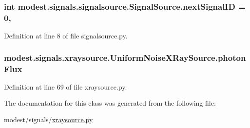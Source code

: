 \subsubsection[{\texorpdfstring{next\+Signal\+ID}{nextSignalID}}]{\setlength{\rightskip}{0pt plus 5cm}int modest.\+signals.\+signalsource.\+Signal\+Source.\+next\+Signal\+ID = 0\hspace{0.3cm}{\ttfamily [static]}, {\ttfamily [inherited]}}\hypertarget{classmodest_1_1signals_1_1signalsource_1_1SignalSource_a453eafb550b551adbec0903deb63dfce}{}\label{classmodest_1_1signals_1_1signalsource_1_1SignalSource_a453eafb550b551adbec0903deb63dfce}


Definition at line 8 of file signalsource.\+py.

\subsubsection[{\texorpdfstring{photon\+Flux}{photonFlux}}]{\setlength{\rightskip}{0pt plus 5cm}modest.\+signals.\+xraysource.\+Uniform\+Noise\+X\+Ray\+Source.\+photon\+Flux}\hypertarget{classmodest_1_1signals_1_1xraysource_1_1UniformNoiseXRaySource_a9b8049972baf6e0640181b58850a3d20}{}\label{classmodest_1_1signals_1_1xraysource_1_1UniformNoiseXRaySource_a9b8049972baf6e0640181b58850a3d20}


Definition at line 69 of file xraysource.\+py.



The documentation for this class was generated from the following file\+:\begin{DoxyCompactItemize}
\item 
modest/signals/\hyperlink{xraysource_8py}{xraysource.\+py}\end{DoxyCompactItemize}
